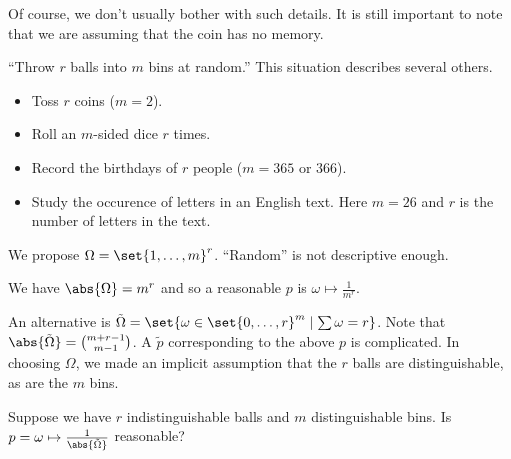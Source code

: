 \begin{examples}
        Of course, we don't usually bother with such details.
        It is still important to note that we are assuming that the coin has no
        memory.
    \item ``Throw $r$ balls into $m$ bins at random.''
        This situation describes several others.
        \begin{itemize}
            \item Toss $r$ coins ($m = 2$).
            \item Roll an $m$-sided dice $r$ times.
            \item Record the birthdays of $r$ people ($m = 365$ or $366$).
            \item Study the occurence of letters in an English text.
                Here $m = 26$ and $r$ is the number of letters in the text.
        \end{itemize}
        We propose $\Omega = \set{1, \dots, m}^{r}$.
        ``Random'' is not descriptive enough.

        We have $\abs{\Omega} = m^{r}$ and so a reasonable $p$ is
        $\omega \mapsto \frac{1}{m^{r}}$.

        An alternative is $\tilde{\Omega} =
        \set{\omega \in \set{0, \dots, r}^{m} \mid \sum \omega = r}$.
        Note that $\abs{\tilde{\Omega}} = \binom{m + r - 1}{m - 1}$.
        A $\tilde{p}$ corresponding to the above $p$ is complicated.
        In choosing $\Omega$, we made an implicit assumption that the $r$ balls
        are distinguishable, as are the $m$ bins.

        Suppose we have $r$ indistinguishable balls and $m$ distinguishable
        bins.
        Is $p = \omega \mapsto \frac{1}{\abs{\tilde{\Omega}}}$ reasonable?
\end{examples}
